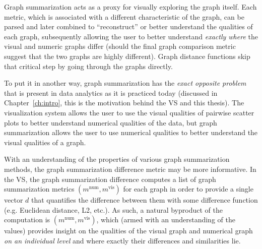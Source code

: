 Graph summarization acts as a proxy for visually exploring the graph 
itself. Each metric, which is associated with a different characteristic of the 
graph, can be parsed and later combined to 
``reconstruct'' or better understand the qualities of each graph, subsequently 
allowing the user to better understand \textit{exactly where} the visual and 
numeric graphs differ (should the final graph comparison metric suggest that 
the two graphs are highly different). Graph distance functions skip that 
critical step by going through 
the graphs directly.

To put it in another way, graph summarization has the \textit{exact opposite 
problem} that is present in data analytics as it is practiced today (discussed 
in Chapter~\ref{ch:intro}, this is the motivation behind the VS and this 
thesis). 
The visualization system allows the user to use the visual qualities of pairwise
scatter plots to better understand numerical qualities of the data, but graph 
summarization allows the user to use numerical qualities to better understand 
the visual qualities of a graph. 

With an understanding of the properties of various graph summarization methods, 
the graph summarization difference metric may be more informative. In the VS, 
the graph summarization difference computes a list of graph summarization 
metrics $(m^\text{num},m^\text{vis})$ for each graph in order to provide a 
single vector $d$ that quantifies the difference between them with 
some difference function (e.g. Euclidean distance, L2, etc.). 
As such, a natural byproduct of the computation is 
$(m^\text{num},m^\text{vis})$, which (armed 
with an understanding of the values) provides insight on the qualities of the 
visual graph and numerical graph \textit{on an individual level} and where 
exactly their differences and similarities lie.